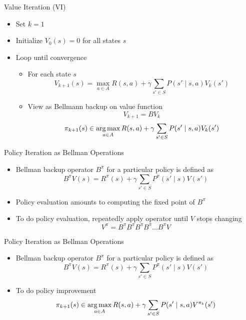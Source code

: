 \documentclass[aspectratio=169]{../latex_main/tntbeamer}  %
\begin{document}
\begin{frame}[c]{Value Iteration (VI)}

\begin{itemize}
	\item  Set $k = 1$
	\item Initialize $V_0(s) = 0$ for all states $s$
	\item Loop until convergence
	\begin{itemize}
		\item For each state $s$
		$$V_{k+1}(s) = \max_{a\in A } R(s,a) + \gamma \sum_{s' \in S } P(s' \mid s,a) V_k(s') $$
		\item View as Bellmann backup on value function
		$$V_{k+1} = BV_k$$
		$$\pi_{k+1}(s) \in \operatorname*{arg\,max}_{a \in A} R(s,a) + \gamma \sum_{s' \in S} P(s' \mid s,a) V_k(s') $$
	\end{itemize}
	
\end{itemize}

\end{frame}
\begin{frame}[c]{Policy Iteration as Bellman Operations}

\begin{itemize}
	\item  Bellman backup operator $B^\pi$ for a particular policy is defined as
	$$ B^\pi V (s) = R^\pi (s) + \gamma \sum_{s' \in S}  P^\pi(s' \mid s ) V (s')  $$
	\item Policy evaluation amounts to computing the fixed point of $B^\pi$
	\item To do policy evaluation, repeatedly apply operator until $V$ stops changing
	$$V^\pi = B^\pi B^\pi B^\pi B^\pi \ldots B^\pi V$$
	\end{itemize}

\end{frame}
\begin{frame}[c]{Policy Iteration as Bellman Operations}

\begin{itemize}
	\item  Bellman backup operator $B^\pi$ for a particular policy is defined as
	$$ B^\pi V (s) = R^\pi (s) + \gamma \sum_{s' \in S}  P^\pi(s' \mid s ) V (s')  $$
	\item To do policy improvement
	$$ \pi_{k+1} (s) \in \operatorname*{arg\,max}_{a \in A} R(s,a) + \gamma \sum_{s'\in S} P(s' \mid s,a) V^{\pi_{k}}(s')$$

\end{itemize}

\end{frame}
\end{document}

